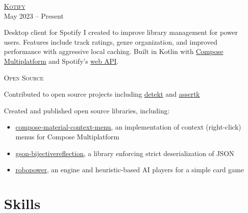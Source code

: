 \documentclass[letterpaper,10pt]{article}
\newenvironment{lcol}
{
    \begin{minipage}[t]{.185\linewidth}
    \begin{flushright}
}
{
    \end{flushright}
    \end{minipage}
}
\newenvironment{rcol}
{
    \begin{minipage}[t]{.8\linewidth}
}
{
    \end{minipage}
}
\begin{document}
\begin{lcol}
    \textsc{\href{https://github.com/dzirbel/kotify}{ Kotify}} \\
    May 2023 -- Present
\end{lcol}
\begin{rcol}
    Desktop client for Spotify I created to improve library management for power users. Features include track ratings, genre organization, and improved performance with aggressive local caching. Built in Kotlin with \href{https://www.jetbrains.com/lp/compose-multiplatform/}{Compose Multiplatform} and Spotify's \href{https://developer.spotify.com/documentation/web-api/}{web API}.
\end{rcol}

\vspace{6pt}

\begin{lcol}
    \textsc{Open Source}
\end{lcol}
\begin{rcol}
    Contributed to open source projects including \href{https://github.com/detekt/detekt/issues?q=author\%3Adzirbel}{\underline{ detekt}} and \href{https://github.com/willowtreeapps/assertk/issues?q=author\%3Adzirbel}{\underline{ assertk}}
    
    \vspace{4pt}

    Created and published open source libraries, including:
    
    \begin{itemize}[itemsep=2pt]
      \item \href{https://github.com/dzirbel/compose-material-context-menu}{ \underline{compose-material-context-menu}}, an implementation of context (right-click) menus for Compose Multiplatform
      \item \href{https://github.com/dzirbel/gson-bijectivereflection}{ \underline{gson-bijectivereflection}}, a library enforcing strict deserialization of JSON
      \item \href{https://github.com/dzirbel/robopower}{ \underline{robopower}}, an engine and heuristic-based AI players for a simple card game
    \end{itemize}
\end{rcol}

\section{Skills}
\end{document}
